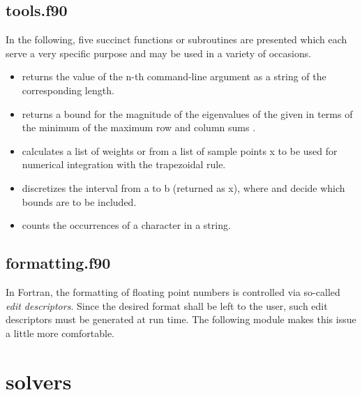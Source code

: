 

\subsection{tools.f90}

In the following, five succinct functions or subroutines are presented which
each serve a very specific purpose and may be used in a variety of occasions.
%
\begin{itemize}
    \item {}
        returns the value of the \code n-th command-line argument as a string of
        the corresponding length.
    \item {}
        returns a bound for the magnitude of the eigenvalues of the given
         in terms of the minimum of the maximum row and column sums
        \cite[Eqs.~1.1, 1.2]{Wolkowicz80}.
    \item {}
        calculates a list of weights or   from a list
        of sample points \code x to be used for numerical integration with the
        trapezoidal rule.
    \item {}
        discretizes the interval from \code a to \code b (returned as \code x),
        where  and  decide which bounds are to be
        included.
    \item {}
        counts the occurrences of a character in a string.
\end{itemize}



\subsection{formatting.f90}

In Fortran, the formatting of floating point numbers is controlled via so-called
\emph{edit descriptors}. Since the desired format shall be left to the user,
such edit descriptors must be generated at run time. The following module makes
this issue a little more comfortable.



\section{ solvers}

